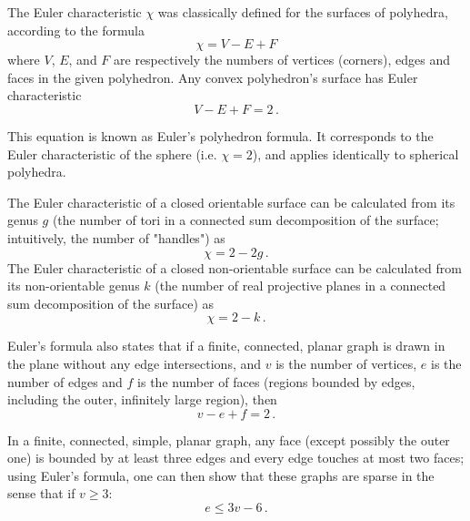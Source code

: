 The Euler characteristic $\chi$ was classically defined for the surfaces of polyhedra, according to the formula
$$\chi =V-E+F$$
where $V$, $E$, and $F$ are respectively the numbers of vertices (corners), edges and faces in the given polyhedron. Any convex polyhedron's surface has Euler characteristic
$$V-E+F=2\,.$$

This equation is known as Euler's polyhedron formula. It corresponds to the Euler characteristic of the sphere (i.e. $\chi = 2$), and applies identically to spherical polyhedra.

The Euler characteristic of a closed orientable surface can be calculated from its genus $g$ (the number of tori in a connected sum decomposition of the surface; intuitively, the number of "handles") as
$$\chi=2-2g\,.$$
The Euler characteristic of a closed non-orientable surface can be calculated from its non-orientable genus $k$ (the number of real projective planes in a connected sum decomposition of the surface) as
$$\chi=2-k\,.$$

Euler's formula also states that if a finite, connected, planar graph is drawn in the plane without any edge intersections, and $v$ is the number of vertices, $e$ is the number of edges and $f$ is the number of faces (regions bounded by edges, including the outer, infinitely large region), then
$$v-e+f=2\,.$$

In a finite, connected, simple, planar graph, any face (except possibly the outer one) is bounded by at least three edges and every edge touches at most two faces; using Euler's formula, one can then show that these graphs are sparse in the sense that if $v \ge 3$:
$$e\leq 3v-6\,.$$ 

